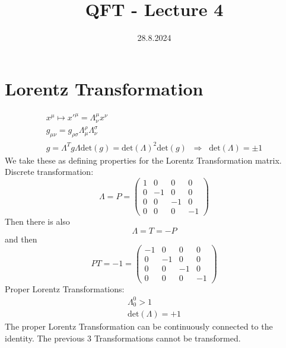 \documentclass[]{scrartcl}
\title{QFT - Lecture 4}
\author{}
\date{28.8.2024}
\begin{document}
\maketitle
\newpage
\tableofcontents
\newpage

\section{Lorentz Transformation} 

\begin{gather}
	x^\mu \mapsto x'^\mu = \Lambda^\mu_\nu x^\nu\\
	g_{\mu\nu} = g_{\rho\sigma}\Lambda^\rho_\mu\Lambda^\sigma_\nu\\
	g = \Lambda^T g \Lambda
	\text{det}(g) = \text{det}(\Lambda)^2 \text{det}(g)\;\;\Rightarrow\;\; \text{det}(\Lambda) = \pm 1
\end{gather}
We take these as defining properties for the Lorentz Transformation matrix.\\
Discrete transformation:
\begin{equation}
	\Lambda = P =
	\begin{pmatrix}
		1 & 0 & 0 & 0\\
		0 & -1 & 0 & 0\\
		0 & 0 & -1 & 0\\
		0 & 0 & 0 & -1
	\end{pmatrix}
\end{equation}
Then there is also
\begin{equation}
	\Lambda = T = -P
\end{equation}
and then
\begin{equation}
	PT = -1 =
	\begin{pmatrix}
		-1 & 0 & 0 & 0\\
		0 & -1 & 0 & 0\\
		0 & 0 & -1 & 0\\
		0 & 0 & 0 & -1
	\end{pmatrix}
\end{equation}
Proper Lorentz Transformations:
\begin{gather}
	\Lambda^0_0 > 1\\
	\text{det}(\Lambda) = +1
\end{gather}
The proper Lorentz Transformation can be continuously connected to the identity. The previous 3 Transformations cannot be transformed.
\end{document}
